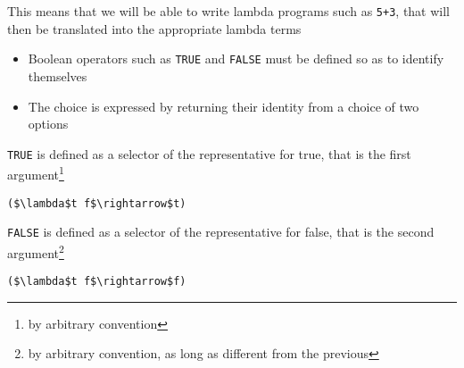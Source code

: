 \documentclass{beamer}
\begin{document}
\begin{frame}[fragile]{\CurrentSection}
\begin{block}{\CurrentSubSection}
This means that we will be able to write lambda programs such as \texttt{5+3}, that will then be translated into the appropriate lambda terms
\end{block}


\end{frame}

\begin{frame}[fragile]{\CurrentSection}
\begin{block}{\CurrentSubSection}
\begin{itemize}
\item Boolean operators such as \texttt{TRUE} and \texttt{FALSE} must be defined so as to identify themselves
\item The choice is expressed by returning their identity from a choice of two options

\end{itemize}

\end{block}


\end{frame}

\begin{frame}[fragile]{\CurrentSection}
\begin{exampleblock}{}
\texttt{TRUE} is defined as a selector of the representative for true, that is the first argument\footnote{by arbitrary convention}
\end{exampleblock}

 
\lstset{basicstyle=\ttfamily\small}\lstset{numbers=none}\lstset{language=ML}\begin{lstlisting}
($\lambda$t f$\rightarrow$t)
\end{lstlisting}
 
\begin{exampleblock}{}
\texttt{FALSE} is defined as a selector of the representative for false, that is the second argument\footnote{by arbitrary convention, as long as different from the previous}
\end{exampleblock}

 
\lstset{basicstyle=\ttfamily\small}\lstset{numbers=none}\lstset{language=ML}\begin{lstlisting}
($\lambda$t f$\rightarrow$f)
\end{lstlisting}
 

\end{frame}
\end{document}
